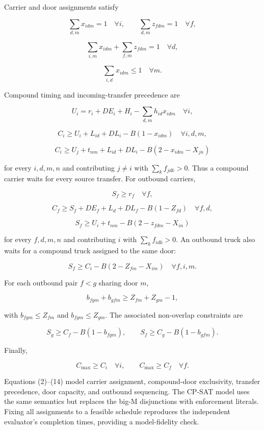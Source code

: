 \documentclass[
]{article}
\begin{document}
Carrier and door assignments satisfy

\[
\sum_{d,m}x_{idm}=1\quad\forall i, \qquad
\sum_{d,m}z_{fdm}=1\quad\forall f, \tag{2}
\]

\[
\sum_{i,m}x_{idm}+\sum_{f,m}z_{fdm}=1\quad\forall d, \tag{3}
\]

\[
\sum_{i,d}x_{idm}\le1\quad\forall m. \tag{4}
\]

Compound timing and incoming-transfer precedence are

\[
U_i=r_i+DE_i+H_i-\sum_{d,m}h_{id}x_{idm}\quad\forall i, \tag{5}
\]

\[
C_i\ge U_i+L_{id}+DL_i-B(1-x_{idm})\quad\forall i,d,m, \tag{6}
\]

\[
C_i\ge U_j+t_{nm}+L_{id}+DL_i-B(2-x_{idm}-X_{jn}) \tag{7}
\]

for every \(i,d,m,n\) and contributing \(j\ne i\) with
\(\sum_k f_{jdk}>0\). Thus a compound carrier waits for every source
transfer. For outbound carriers,

\[
S_f\ge r_f\quad\forall f, \tag{8}
\]

\[
C_f\ge S_f+DE_f+L_d+DL_f-B(1-Z_{fd})\quad\forall f,d, \tag{9}
\]

\[
S_f\ge U_i+t_{nm}-B(2-z_{fdm}-X_{in}) \tag{10}
\]

for every \(f,d,m,n\) and contributing \(i\) with \(\sum_k f_{idk}>0\).
An outbound truck also waits for a compound truck assigned to the same
door:

\[
S_f\ge C_i-B(2-Z_{fm}-X_{im})\quad\forall f,i,m. \tag{11}
\]

For each outbound pair \(f<g\) sharing door \(m\),

\[
b_{fgm}+b_{gfm}\ge Z_{fm}+Z_{gm}-1, \tag{12}
\]

with \(b_{fgm}\le Z_{fm}\) and \(b_{fgm}\le Z_{gm}\). The associated
non-overlap constraints are

\[
S_g\ge C_f-B(1-b_{fgm}),\qquad
S_f\ge C_g-B(1-b_{gfm}). \tag{13}
\]

Finally,

\[
C_{\max}\ge C_i\quad\forall i,\qquad
C_{\max}\ge C_f\quad\forall f. \tag{14}
\]

Equations (2)--(14) model carrier assignment, compound-door exclusivity,
transfer precedence, door capacity, and outbound sequencing. The CP-SAT
model uses the same semantics but replaces the big-M disjunctions with
enforcement literals. Fixing all assignments to a feasible schedule
reproduces the independent evaluator's completion times, providing a
model-fidelity check.
\end{document}
